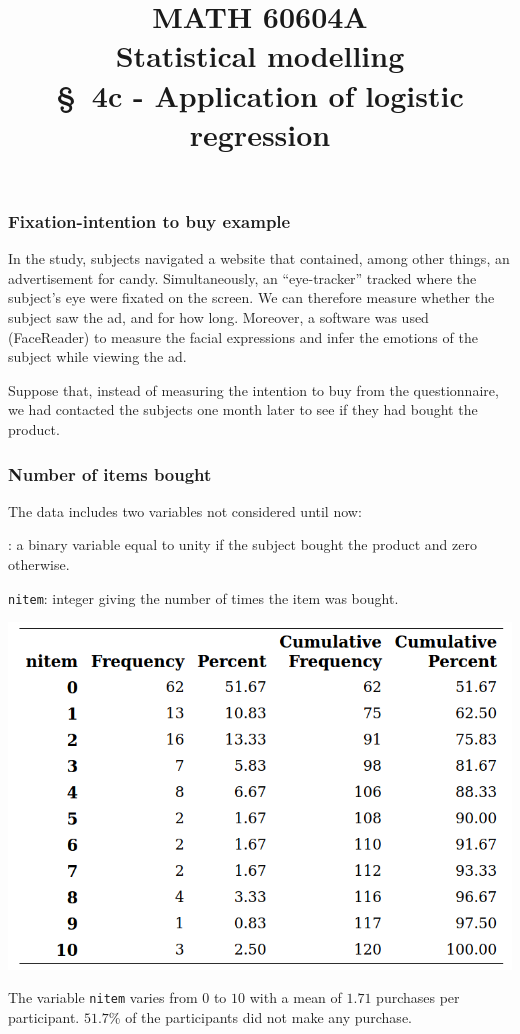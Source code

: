 \documentclass{beamer}
\title[\color{white}{MATH 60604A \S~4c - Application of logistic regression}]{\texorpdfstring{MATH 60604A \\Statistical modelling \\ \S~4c - Application of logistic regression}{MATH 60604A \\Statistical modelling \\ \S~4c - Application of logistic regression}}
\author{}
\institute{HEC Montréal\\
Department of Decision Sciences}
\date{}
\begin{document}
\frame{\titlepage}


\begin{frame}[fragile]
\frametitle{Fixation-intention to buy example}

 In the study, subjects navigated a website that contained, among other things, an advertisement for candy. Simultaneously, an ``eye-tracker'' tracked where the subject's eye were fixated on the screen. We can therefore measure whether the subject saw the ad, and for how long. Moreover, a software was used (FaceReader) to measure the facial expressions and infer the emotions of the subject while viewing the ad.
\vp


Suppose that, instead of measuring the intention to buy from the questionnaire, \alert{we had contacted the subjects one month later to see if they had bought the product}.
\end{frame}
\begin{frame}
\frametitle{Number of items bought}
The data includes two variables not considered until now:

\bi\item {}: a binary variable equal to unity if the subject bought the product and zero otherwise.
\item \texttt{nitem}: integer giving the number of times the item was bought.
\ei
\begin{center}
\includegraphics[width = 0.6\linewidth]{img/c4/slides8-e2}
\end{center}
The variable \texttt{nitem} varies from $0$ to $10$ with a mean of $1.71$ purchases per participant. $51.7$\% of the participants did not make any purchase.
\end{frame}
\end{document}
